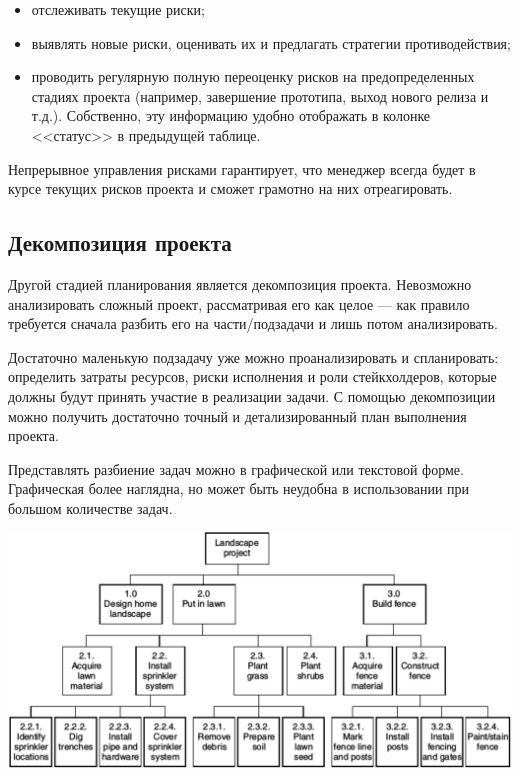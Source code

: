 \documentclass{../../text-style}
\begin{document}
\begin{itemize}
    \item отслеживать текущие риски;
    \item выявлять новые риски, оценивать их и предлагать стратегии противодействия;
    \item проводить регулярную полную переоценку рисков на предопределенных стадиях проекта (например, завершение прототипа, выход нового релиза и т.д.). Собственно, эту информацию удобно отображать в колонке <<статус>> в предыдущей таблице.
\end{itemize}

Непрерывное управления рисками гарантирует, что менеджер всегда будет в курсе текущих рисков проекта и сможет грамотно на них отреагировать.

\subsection{Декомпозиция проекта}

Другой стадией планирования является декомпозиция проекта. Невозможно анализировать сложный проект, рассматривая его как целое --- как правило требуется сначала разбить его на части/подзадачи и лишь потом анализировать.

Достаточно маленькую подзадачу уже можно проанализировать и спланировать: определить затраты ресурсов, риски исполнения и роли стейкхолдеров, которые должны будут принять участие в реализации задачи. С помощью декомпозиции можно получить достаточно точный и детализированный план выполнения проекта.

Представлять разбиение задач можно в графической или текстовой форме. Графическая более наглядна, но может быть неудобна в использовании при большом количестве задач. 

\begin{center}
    \includegraphics[width=\textwidth]{wbsExample.png}
\end{center}
\end{document}
